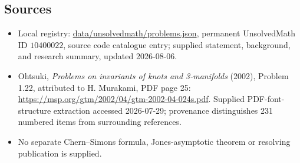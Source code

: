 \documentclass[11pt]{article}
\begin{document}
\subsection{Sources}
\begin{itemize}
\item Local registry: \url{data/unsolvedmath/problems.json}, permanent UnsolvedMath ID \(10400022\), source code catalogue entry; supplied statement, background, and research summary, updated 2026-08-06.
\item Ohtsuki, \emph{Problems on invariants of knots and 3-manifolds} (2002), Problem 1.22, attributed to H. Murakami, PDF page 25: \url{https://msp.org/gtm/2002/04/gtm-2002-04-024s.pdf}. Supplied PDF-font-structure extraction accessed 2026-07-29; provenance distinguishes 231 numbered items from surrounding references.
\item No separate Chern--Simons formula, Jones-asymptotic theorem or resolving publication is supplied.
\end{itemize}
\end{document}
